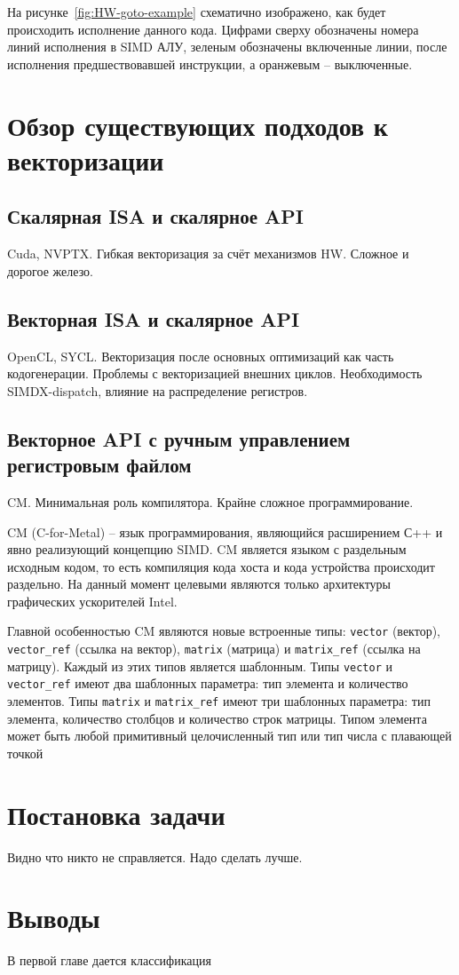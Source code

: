 На рисунке~\ref{fig:HW-goto-example} схематично изображено, как будет происходить исполнение данного кода. Цифрами сверху обозначены номера линий исполнения в SIMD АЛУ, зеленым обозначены включенные линии, после исполнения предшествовавшей инструкции, а оранжевым -- выключенные.

\section{Обзор существующих подходов к векторизации}\label{sec:overview/vectorizing}

\subsection{Скалярная ISA и скалярное API}\label{subsec:overview/vectorizing/cuda}

Cuda, NVPTX. Гибкая векторизация за счёт механизмов HW. Сложное и дорогое железо.

\subsection{Векторная ISA и скалярное API}\label{subsec:overview/vectorizing/sycl}

OpenCL, SYCL. Векторизация после основных оптимизаций как часть кодогенерации. Проблемы с векторизацией внешних циклов. Необходимость SIMDX-dispatch, влияние на распределение регистров.

\subsection{Векторное API с ручным управлением регистровым файлом}\label{subsec:overview/vectorizing/cm}

CM. Минимальная роль компилятора. Крайне сложное программирование.

CM (C-for-Metal) -- язык программирования, являющийся расширением С++ и явно реализующий концепцию SIMD. CM является языком с раздельным исходным кодом, то есть компиляция кода хоста и кода устройства происходит раздельно. На данный момент целевыми являются только архитектуры графических ускорителей Intel.

Главной особенностью CM являются новые встроенные типы: \texttt{vector} (вектор), \texttt{vector\_ref} (ссылка на вектор), \texttt{matrix} (матрица) и \texttt{matrix\_ref} (ссылка на матрицу). Каждый из этих типов является шаблонным. Типы \texttt{vector} и \texttt{vector\_ref} имеют два шаблонных параметра: тип элемента и количество элементов. Типы \texttt{matrix} и \texttt{matrix\_ref} имеют три шаблонных
параметра: тип элемента, количество столбцов и количество строк матрицы. Типом элемента может быть любой примитивный целочисленный тип или тип числа с плавающей точкой

\section{Постановка задачи}\label{sec:overview/howtobetter}

Видно что никто не справляется. Надо сделать лучше.

\section{Выводы}\label{sec:overview/outcome}

В первой главе дается классификация

\FloatBarrier
